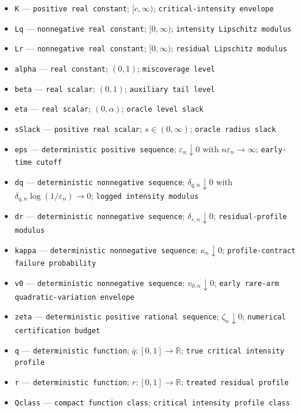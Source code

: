 \documentclass{article}
\begin{document}
\begin{itemize}
  \item \texttt{K} --- \texttt{positive real constant}; \([c,\infty)\); \texttt{critical-\allowbreak{}intensity envelope}
  \item \texttt{Lq} --- \texttt{nonnegative real constant}; \([0,\infty)\); \texttt{intensity Lipschitz modulus}
  \item \texttt{Lr} --- \texttt{nonnegative real constant}; \([0,\infty)\); \texttt{residual Lipschitz modulus}
  \item \texttt{alpha} --- \texttt{real constant}; \((0,1)\); \texttt{miscoverage level}
  \item \texttt{beta} --- \texttt{real scalar}; \((0,1)\); \texttt{auxiliary tail level}
  \item \texttt{eta} --- \texttt{real scalar}; \((0,\alpha)\); \texttt{oracle level slack}
  \item \texttt{sSlack} --- \texttt{positive real scalar}; \(s\in(0,\infty)\); \texttt{oracle radius slack}
  \item \texttt{eps} --- \texttt{deterministic positive sequence}; \(\varepsilon_n\downarrow0\) with \(n\varepsilon_n\to\infty\); \texttt{early-\allowbreak{}time cutoff}
  \item \texttt{dq} --- \texttt{deterministic nonnegative sequence}; \(\delta_{q,n}\downarrow0\) with \(\delta_{q,n}\log(1/\varepsilon_n)\to0\); \texttt{logged intensity modulus}
  \item \texttt{dr} --- \texttt{deterministic nonnegative sequence}; \(\delta_{r,n}\downarrow0\); \texttt{residual-\allowbreak{}profile modulus}
  \item \texttt{kappa} --- \texttt{deterministic nonnegative sequence}; \(\kappa_n\downarrow0\); \texttt{profile-\allowbreak{}contract failure probability}
  \item \texttt{v0} --- \texttt{deterministic nonnegative sequence}; \(v_{0,n}\downarrow0\); \texttt{early rare-\allowbreak{}arm quadratic-\allowbreak{}variation envelope}
  \item \texttt{zeta} --- \texttt{deterministic positive rational sequence}; \(\zeta_n\downarrow0\); \texttt{numerical certification budget}
  \item \texttt{q} --- \texttt{deterministic function}; \(\bar q:[0,1]\to\mathbb R\); \texttt{true critical intensity profile}
  \item \texttt{r} --- \texttt{deterministic function}; \(r:[0,1]\to\mathbb R\); \texttt{treated residual profile}
  \item \texttt{Qclass} --- \texttt{compact function class}; \texttt{critical intensity profile class}

\end{itemize}
\end{document}
